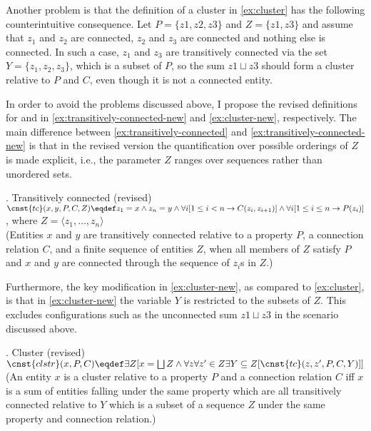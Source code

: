 Another problem is that the definition of a cluster in \ref{ex:cluster} has the following counterintuitive consequence. Let $P = \{z1, z2, z3\}$ and $Z = \{z1, z3\}$ and assume that $z_1$ and $z_2$ are connected, $z_2$ and $z_3$ are connected and nothing else is connected. In such a case, $z_1$ and $z_3$ are transitively connected via the set $Y = \{z_1, z_2, z_3\}$, which is a subset of $P$, so the sum $z1 \sqcup z3$ should form a cluster relative to $P$ and $C$, even though it is not a connected entity.

In order to avoid the problems discussed above, I propose the revised definitions for  and  in \ref{ex:transitively-connected-new} and \ref{ex:cluster-new}, respectively. The main difference between \ref{ex:transitively-connected} and \ref{ex:transitively-connected-new} is that in the revised version the quantification over possible orderings of $Z$ is made explicit, i.e., the parameter $Z$ ranges over sequences rather than unordered sets.\largerpage[2]

\ex. Transitively connected (revised)\\
$\cnst{tc}(x,y,P,C,Z) \eqdef z_1 = x \wedge z_n = y \wedge \forall i[1 \leq i < n \rightarrow C(z_i,z_{i+1})]\\
\wedge \forall i[1 \leq i \leq n \rightarrow P(z_i)]$, where $Z = \langle z_1, \dots, z_n\rangle$\\
(Entities $x$ and $y$ are transitively connected relative to a property $P$, a connection relation $C$, and a finite sequence of entities $Z$, when all members of $Z$ satisfy $P$ and $x$ and $y$ are connected through the sequence of $z_i$s in $Z$.)\label{ex:transitively-connected-new}

Furthermore, the key modification in \ref{ex:cluster-new}, as compared to \ref{ex:cluster}, is that in \ref{ex:cluster-new} the variable $Y$ is restricted to the subsets of $Z$. This excludes configurations such as the unconnected sum $z1 \sqcup z3$ in the scenario discussed above. 

\ex. Cluster (revised)\\
$\cnst{clstr}(x,P,C) \eqdef \exists Z[x = \bigsqcup Z \wedge \forall z \forall z' \in Z \exists Y \subseteq Z[\cnst{tc}(z,z',P,C,Y)]]$\\
(An entity $x$ is a cluster relative to a property $P$ and a connection relation $C$ iff $x$ is a sum of entities falling under the same property which are all transitively connected relative to $Y$ which is a subset of a sequence $Z$ under the same property and connection relation.)\label{ex:cluster-new}

